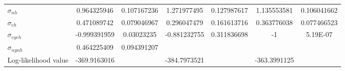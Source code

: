 \documentclass[10pt]{beamer}
\begin{document}
\begin{frame}[label=Reg_US]
{\begin{tabular}{@{}lSSSSSS@{}}
		$\sigma_{nh}$               & 0.964325946  & 0.107167236 & 1.271977495         & 0.127987617        & 1.135553581         & 0.106041662       \\
		$\sigma_{eh}$               & 0.471089742  & 0.079046967 & 0.296047479         & 0.161613716        & 0.363776038         & 0.077466523       \\
		$\sigma_{eyeh}$             & -0.999391959 & 0.03023235  & -0.881232755        & 0.311836698        & -1                  & 5.19E-07          \\
		$\sigma_{nynh}$             & 0.464225409  & 0.094391207 &                     &                    &                     &                   \\
		Log-likelihood value        & -369.9163016 &             & -384.7973521        &                    & -363.3991125        &                   \\ \bottomrule
\end{tabular}}

	\hyperlink{StateSpace}{}		

\end{frame}

\end{document}
